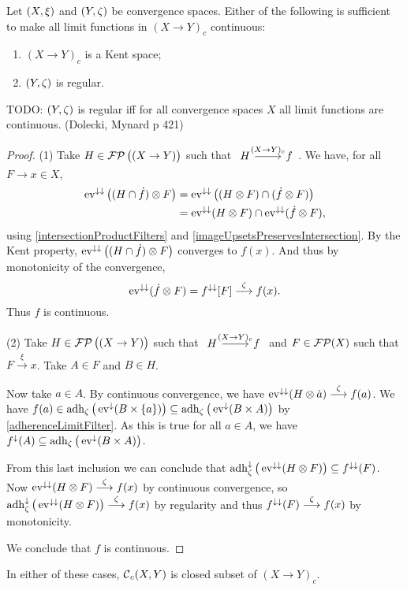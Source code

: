 \begin{proposition} \label{continuousLimitsContinuous}
Let $\sSet{X,\xi}$ and $\sSet{Y,\zeta}$ be convergence spaces. Either of the following is sufficient to make all limit functions in $(X\to Y)_c$ continuous:
\begin{enumerate}
\item $(X\to Y)_c$ is a Kent space;
\item $\sSet{Y,\zeta}$ is regular. 
\end{enumerate}
\end{proposition}
TODO: $\sSet{Y,\zeta}$ is regular iff for all convergence spaces $X$ all limit functions are continuous. (Dolecki, Mynard p 421)
\begin{proof}
(1) Take $H\in\operatorname{\mathcal{FP}}\big((X\to Y)\big)$ such that $\begin{tikzcd}H \arrow[r, "{(X\to Y)_c}"] & f\end{tikzcd}$. We have, for all $F\to x\in X$,
\begin{align*}
\operatorname{ev}^{\downarrow\downarrow}\big((H\cap \dot{f})\otimes F\big) &= \operatorname{ev}^{\downarrow\downarrow}\big((H \otimes F) \cap (\dot{f} \otimes F)\big) \\
&= \operatorname{ev}^{\downarrow\downarrow}(H \otimes F) \cap \operatorname{ev}^{\downarrow\downarrow}(\dot{f} \otimes F),
\end{align*} 
using \ref{intersectionProductFilters} and \ref{imageUpsetsPreservesIntersection}. By the Kent property, $\operatorname{ev}^{\downarrow\downarrow}\big((H\cap \dot{f})\otimes F\big)$ converges to $f(x)$. And thus by monotonicity of the convergence,
\[ \operatorname{ev}^{\downarrow\downarrow}(\dot{f} \otimes F) = f^{\downarrow\downarrow}[F] \overset{\zeta}{\longrightarrow} f(x). \]
Thus $f$ is continuous.

(2) Take $H\in\operatorname{\mathcal{FP}}\big((X\to Y)\big)$ such that $\begin{tikzcd}H \arrow[r, "{(X\to Y)_c}"] & f\end{tikzcd}$ and $F\in\operatorname{\mathcal{FP}}(X)$ such that $F\overset{\xi}{\longrightarrow} x$. Take $A\in F$ and $B\in H$.

Now take $a\in A$. By continuous convergence, we have $\operatorname{ev}^{\downarrow\downarrow}(H\otimes\dot{a}) \overset{\zeta}{\longrightarrow} f(a)$. We have $f(a)\in\operatorname{adh}_\zeta\big(\operatorname{ev}^\downarrow(B\times\{a\})\big) \subseteq \operatorname{adh}_\zeta\big(\operatorname{ev}^\downarrow(B\times A)\big)$ by \ref{adherenceLimitFilter}. As this is true for all $a\in A$, we have $f^\downarrow(A) \subseteq \operatorname{adh}_\zeta\big(\operatorname{ev}^\downarrow(B\times A)\big)$.

From this last inclusion we can conclude that $\operatorname{adh}_\zeta^\downarrow\big(\operatorname{ev}^{\downarrow\downarrow}(H\otimes F)\big) \subseteq f^{\downarrow\downarrow}(F)$. Now $\operatorname{ev}^{\downarrow\downarrow}(H\otimes F)\overset{\zeta}{\longrightarrow} f(x)$ by continuous convergence, so $\operatorname{adh}_\zeta^\downarrow\big(\operatorname{ev}^{\downarrow\downarrow}(H\otimes F)\big)\overset{\zeta}{\longrightarrow} f(x)$ by regularity and thus $f^{\downarrow\downarrow}(F)\overset{\zeta}{\longrightarrow} f(x)$ by monotonicity.

We conclude that $f$ is continuous.
\end{proof}
\begin{corollary} \label{setOfContinuousFunctionsContinuouslyClosed}
In either of these cases, $\operatorname{\mathcal{C}}_c(X,Y)$ is closed subset of $(X\to Y)_c$.
\end{corollary}

